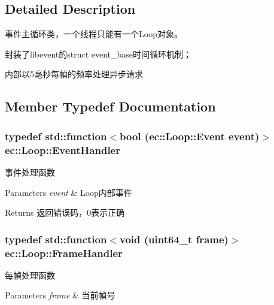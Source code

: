 \subsection{Detailed Description}
事件主循环类，一个线程只能有一个\-Loop对象。 

封装了libevent的struct event\-\_\-base时间循环机制；

内部以5毫秒每幀的频率处理异步请求 

\subsection{Member Typedef Documentation}
\hypertarget{classec_1_1Loop_a7c68e22f03ea2b4b670a440291438aed}{
\subsubsection[{Event\-Handler}]{\setlength{\rightskip}{0pt plus 5cm}typedef std\-::function$<$bool ({\bf ec\-::\-Loop\-::\-Event} event)$>$ {\bf ec\-::\-Loop\-::\-Event\-Handler}}}\label{classec_1_1Loop_a7c68e22f03ea2b4b670a440291438aed}


事件处理函数 


\begin{DoxyParams}{Parameters}
{\em event} & Loop内部事件 \\
\hline
\end{DoxyParams}
\begin{DoxyReturn}{Returns}
返回错误码，0表示正确 
\end{DoxyReturn}
\hypertarget{classec_1_1Loop_aaa0d9bf951a410663fc354e5be062229}{
\subsubsection[{Frame\-Handler}]{\setlength{\rightskip}{0pt plus 5cm}typedef std\-::function$<$void (uint64\-\_\-t frame)$>$ {\bf ec\-::\-Loop\-::\-Frame\-Handler}}}\label{classec_1_1Loop_aaa0d9bf951a410663fc354e5be062229}


每幀处理函数 


\begin{DoxyParams}{Parameters}
{\em frame} & 当前幀号 \\
\hline
\end{DoxyParams}


